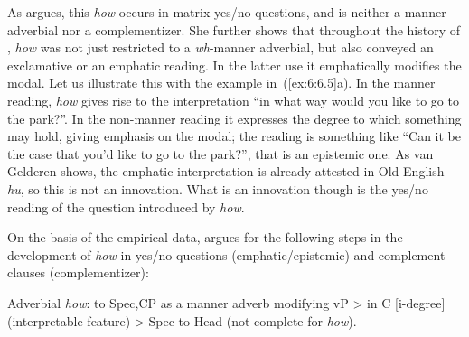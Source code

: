 \documentclass[output=paper]{langsci/langscibook}
\begin{document}
As \citeauthor{vanGelderen2015} argues, this \emph{how} occurs in matrix yes/no
questions, and is neither a manner adverbial nor a complementizer. She further
shows that throughout the history of , \emph{how} was not just
restricted to a \emph{wh}-manner adverbial, but also conveyed an exclamative or
an emphatic reading.  In the latter use it emphatically modifies the modal. Let
us illustrate this with the example in~(\ref{ex:6:6.5}a). In the manner reading, \emph{how}
gives rise to the interpretation “in what way would you like to go to the
park?”. In the non-manner reading it expresses the degree to which something
may hold, giving emphasis on the modal; the reading is something like “Can it
be the case that you’d like to go to the park?”, that is an epistemic one. As
van Gelderen shows, the emphatic interpretation is already attested in Old
English \emph{hu}, so this is not an innovation. What is an innovation though
is the yes/no reading of the question introduced by \emph{how}.

On the basis of the empirical data, \citeauthor{vanGelderen2015} argues for the
following steps in the development of \emph{how} in yes/no questions
(emphatic/epistemic) and complement clauses (complementizer):\largerpage[-2]

\ea\label{ex:6:6.6}
	\ea Adverbial \emph{how}:  to Spec,CP as a manner adverb modifying vP >
	\ex {} in C [i-degree] (interpretable feature) >
	\ex Spec to Head (not complete for \emph{how}).
	\z
\z
\end{document}
